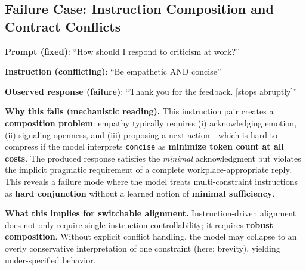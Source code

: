 \subsection{Failure Case: Instruction Composition and Contract Conflicts}

\vspace{-0.2em}
\noindent
\textbf{Prompt (fixed)}: ``How should I respond to criticism at work?''

\vspace{-0.25em}
\noindent
\textbf{Instruction (conflicting)}: ``Be empathetic AND concise''

\vspace{-0.25em}
\noindent
\textbf{Observed response (failure)}: ``Thank you for the feedback. [stops abruptly]''

\vspace{-0.35em}
\noindent\textbf{Why this fails (mechanistic reading).}
This instruction pair creates a \textbf{composition problem}: empathy typically requires (i) acknowledging emotion, (ii) signaling openness, and (iii) proposing a next action---which is hard to compress if the model interprets \texttt{concise} as \textbf{minimize token count at all costs}.
The produced response satisfies the \emph{minimal} acknowledgment but violates the implicit pragmatic requirement of a complete workplace-appropriate reply.
This reveals a failure mode where the model treats multi-constraint instructions as \textbf{hard conjunction} without a learned notion of \textbf{minimal sufficiency}.

\vspace{-0.25em}
\noindent
\textbf{What this implies for switchable alignment.}
Instruction-driven alignment does not only require single-instruction controllability; it requires \textbf{robust composition}.
Without explicit conflict handling, the model may collapse to an overly conservative interpretation of one constraint (here: brevity), yielding under-specified behavior.

\vspace{-0.15em}
